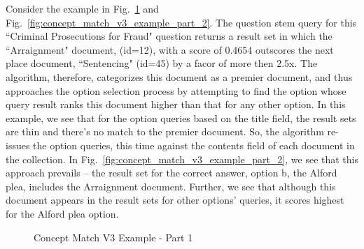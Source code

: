 Consider the example in Fig.~\ref{fig:concept_match_v3_example_part_1} and Fig.~\ref{fig:concept_match_v3_example_part_2}.  The question stem query for this ``Criminal Prosecutions for Fraud" question returns a result set in which the ``Arraignment" document, (id=12), with a score of 0.4654 outscores the next place document, ``Sentencing" (id=45) by a facor of more then 2.5x.  The algorithm, therefore,  categorizes this document as a premier document, and thus approaches the option selection process by attempting to find the option whose query result ranks this document higher than that for any other option.  In this example, we see that for the option queries based on the title field, the result sets are thin and there's no match to the premier document.  So, the algorithm re-issues the option queries, this time against the contents field of each document in the collection.  In Fig.~\ref{fig:concept_match_v3_example_part_2}, we see that this approach prevails -- the result set for the correct answer, option b, the Alford plea, includes the Arraignment document.  Further, we see that although this document appears in the result sets for other options' queries, it scores highest for the Alford plea option.

\begin{figure}
\centering
\vspace{0.75in}
\caption{Concept Match V3 Example - Part 1}
\label{fig:concept_match_v3_example_part_1}
\end{figure}

